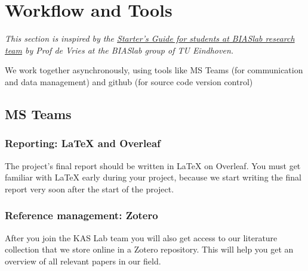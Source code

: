 \chapter{Workflow and Tools}\label{c:workflow-tools}

\textit{This section is inspired by the \href{https://biaslab.github.io/research/starter-guide/}{Starter's Guide for students at BIASlab research team} by Prof de Vries at the BIASlab group of TU Eindhoven.}

We work together asynchronously, using tools like MS Teams (for communication and data management) and github (for source code version control)

\section{MS Teams}

\subsection{Reporting: LaTeX and Overleaf}
The project’s final report should be written in LaTeX on Overleaf. You must get familiar with LaTeX early during your project, because we start writing the final report very soon after the start of the project.

\subsection{Reference management: Zotero}
After you join the KAS Lab team you will also get access to our literature collection that we store online in a Zotero repository. This will help you get an overview of all relevant papers in our field.

